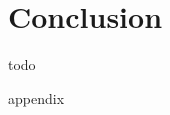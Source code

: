 \documentclass[a4paper,12pt,twocolumn]{article}
\begin{document}
\section{Conclusion}

todo



\onecolumn
\begin{appendices}

appendix

\end{appendices}


\clearpage


\end{document}
